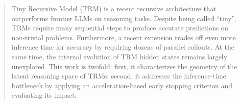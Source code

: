 \documentclass{article}
\begin{document}

\printAffiliationsAndNotice{}

\begin{abstract}

Tiny Recursive Model (TRM) is a recent recursive architecture that outperforms frontier LLMs on reasoning tasks.
Despite being called ``tiny'', TRMs require many sequential steps to produce accurate predictions on non-trivial problems.
Furthermore, a recent extension trades off even more inference time for accuracy by requiring dozens of parallel rollouts.
At the same time, the internal evolution of TRM hidden states remains largely unexplored.
This work is twofold: first, it characterizes the geometry of the latent reasoning space of TRMs; second, it addresses the inference-time bottleneck by applying an acceleration-based early stopping criterion and evaluating its impact.

\end{abstract}


\end{document}
